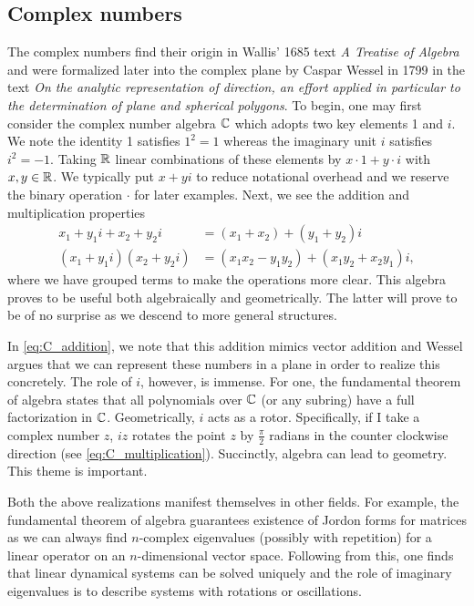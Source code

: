 \documentclass[12pt]{article}
\begin{document}
\subsection{Complex numbers}
The complex numbers find their origin in Wallis' 1685 text \emph{A Treatise of Algebra} and were formalized later into the complex plane by Caspar Wessel in 1799 in the text \emph{On the analytic representation of direction, an effort applied in particular to the determination of plane and spherical polygons}. To begin, one may first consider the complex number algebra $\mathbb{C}$ which adopts two key elements 1 and $i$. We note the identity 1 satisfies  $1^2=1$ whereas the imaginary unit $i$ satisfies $i^2=-1$. Taking $\mathbb{R}$ linear combinations of these elements by $x\cdot 1 + y \cdot i$ with $x,y \in \mathbb{R}$. We typically put $x+yi$ to reduce notational overhead and we reserve the binary operation $\cdot$ for later examples. Next, we see the addition and multiplication properties
\begin{align}
\label{eq:C_addition}
    x_1 + y_1 i + x_2 + y_2i  &= (x_1+x_2)+(y_1+y_2)i\\
\label{eq:C_multiplication}
    (x_1 + y_1 i)(x_2 + y_2i) &= (x_1x_2-y_1y_2)+(x_1y_2+x_2y_1)i,
\end{align}
where we have grouped terms to make the operations more clear. This algebra proves to be useful both algebraically and geometrically. The latter will prove to be of no surprise as we descend to more general structures.

In \cref{eq:C_addition}, we note that this addition mimics vector addition and Wessel argues that we can represent these numbers in a plane in order to realize this concretely. The role of $i$, however, is immense. For one, the fundamental theorem of algebra states that all polynomials over $\mathbb{C}$ (or any subring) have a full factorization in $\mathbb{C}$. Geometrically, $i$ acts as a rotor. Specifically, if I take a complex number $z$, $iz$ rotates the point $z$ by $\frac{\pi}{2}$ radians in the counter clockwise direction (see \cref{eq:C_multiplication}). Succinctly, algebra can lead to geometry. This theme is important.

Both the above realizations manifest themselves in other fields. For example, the fundamental theorem of algebra guarantees existence of Jordon forms for matrices as we can always find $n$-complex eigenvalues (possibly with repetition) for a linear operator on an $n$-dimensional vector space. Following from this, one finds that linear dynamical systems can be solved uniquely and the role of imaginary eigenvalues is to describe systems with rotations or oscillations. 
\end{document}
